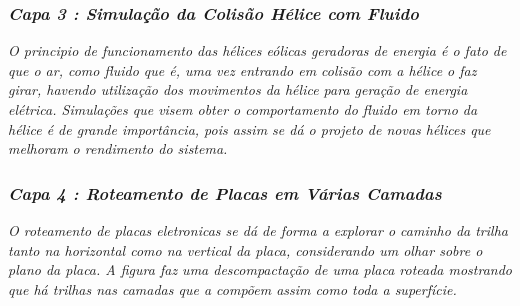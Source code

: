 \documentclass[11pt, a4paper, oneside]{article}
\begin{document}
\subsubsection{\textit{Capa 3 : Simulação da Colisão Hélice com Fluido}}
\textit{O principio de funcionamento das hélices eólicas geradoras de energia é o fato de que o ar, como fluido que é, uma vez entrando em colisão com a hélice
o faz girar, havendo utilização dos movimentos da hélice para geração de energia elétrica. Simulações que visem obter o comportamento do fluido em torno da hélice
é de grande importância, pois assim se dá o projeto de novas hélices que melhoram o rendimento do sistema.}

\subsubsection{\textit{Capa 4 : Roteamento de Placas em Várias Camadas}}
\textit{O roteamento de placas eletronicas se dá de forma a explorar o caminho da trilha tanto na horizontal como na vertical da placa, considerando um olhar sobre o plano da placa. 
A figura faz uma descompactação de uma placa roteada mostrando que há trilhas nas camadas que a compõem assim como toda a superfície.}

\newpage
\end{document}
